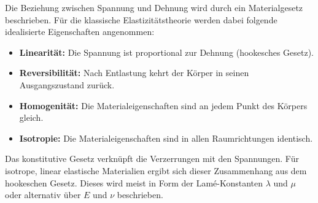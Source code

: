 Die Beziehung zwischen Spannung und Dehnung wird durch ein Materialgesetz beschrieben. Für die klassische Elastizitätstheorie werden dabei folgende idealisierte Eigenschaften angenommen:
\begin{itemize}
	\item \textbf{Linearität:} Die Spannung ist proportional zur Dehnung (hookesches Gesetz).
	\item \textbf{Reversibilität:} Nach Entlastung kehrt der Körper in seinen Ausgangszustand zurück.
	\item \textbf{Homogenität:} Die Materialeigenschaften sind an jedem Punkt des Körpers gleich.
	\item \textbf{Isotropie:} Die Materialeigenschaften sind in allen Raumrichtungen identisch.
\end{itemize}

Das konstitutive Gesetz verknüpft die Verzerrungen mit den Spannungen. Für isotrope, linear elastische Materialien ergibt sich dieser Zusammenhang aus dem hookeschen Gesetz. Dieses wird meist in Form der Lamé-Konstanten $\lambda$ und $\mu$ oder alternativ über $E$ und $\nu$ beschrieben.

